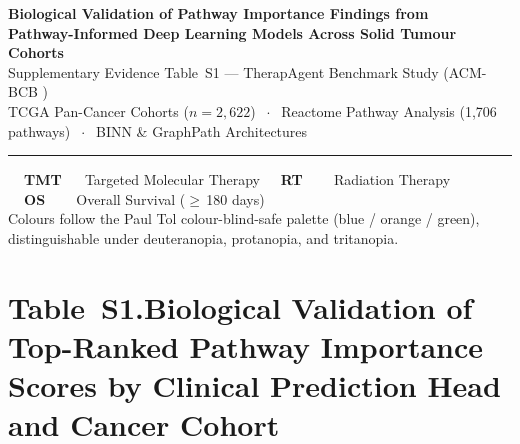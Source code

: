 \documentclass[11pt,a4paper]{article}
\begin{document}

\begin{center}
{\LARGE\bfseries\color{NavyBlue}
Biological Validation of Pathway Importance Findings from\\[4pt]
Pathway-Informed Deep Learning Models Across Solid Tumour Cohorts}\\[7pt]
{\large\color{MidBlue}
Supplementary Evidence Table~S1 --- TherapAgent Benchmark Study (ACM-BCB )}\\[5pt]
{\normalsize\color{SubtleGrey}
TCGA Pan-Cancer Cohorts ($n = 2{,}622$)
$\;\cdot\;$ Reactome Pathway Analysis (1,706 pathways)
$\;\cdot\;$ BINN \& GraphPath Architectures}\\[5pt]
\textcolor{BorderGrey}{\rule{\linewidth}{1.2pt}}
\end{center}

\vspace{4pt}

\begin{center}
\small
\colorbox{TMTheadBg}{\color{White}\textbf{\ \ TMT\ \ }}\ Targeted Molecular Therapy
\qquad
\colorbox{RTheadBg}{\color{White}\textbf{\ \ RT\ \ \ }}\ Radiation Therapy
\qquad
\colorbox{OSheadBg}{\color{White}\textbf{\ \ OS\ \ \ }}\ Overall Survival ($\geq$\,180 days)
\\[3pt]
{\footnotesize\color{SubtleGrey}
Colours follow the Paul Tol colour-blind-safe palette (blue / orange / green),
distinguishable under deuteranopia, protanopia, and tritanopia.}
\end{center}

\vspace{6pt}

\section*{Table~S1.\enspace Biological Validation of Top-Ranked Pathway Importance Scores
  by Clinical Prediction Head and Cancer Cohort}

\begingroup
\small
\setlength{\arrayrulewidth}{0.4pt}
\renewcommand{\arraystretch}{1.65}
\end{document}
